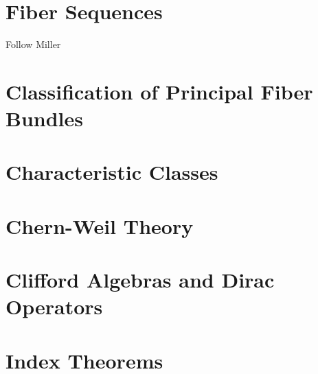 \section{Fiber Sequences}
Follow Miller

\section{Classification of Principal Fiber Bundles}

\section{Characteristic Classes}

\section{Chern-Weil Theory}
\section{Clifford Algebras and Dirac Operators}
\section{Index Theorems}

